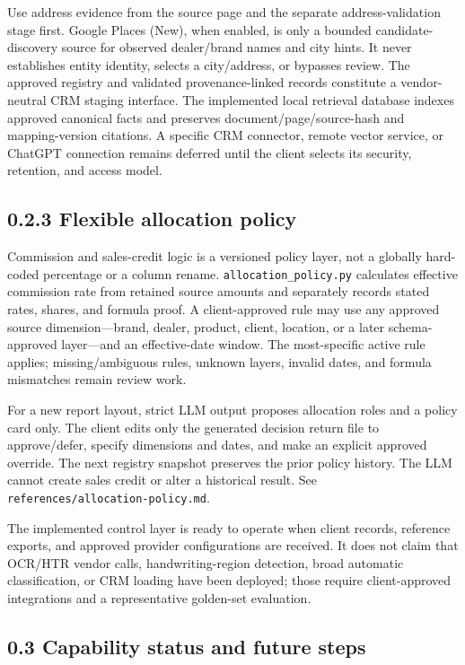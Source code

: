 \documentclass[
]{article}
\begin{document}
Use address evidence from the source page and the separate
address-validation stage first. Google Places (New), when enabled, is
only a bounded candidate-discovery source for observed dealer/brand
names and city hints. It never establishes entity identity, selects a
city/address, or bypasses review. The approved registry and validated
provenance-linked records constitute a vendor-neutral CRM staging
interface. The implemented local retrieval database indexes approved
canonical facts and preserves document/page/source-hash and
mapping-version citations. A specific CRM connector, remote vector
service, or ChatGPT connection remains deferred until the client selects
its security, retention, and access model.

\subsection{0.2.3 Flexible allocation
policy}\label{flexible-allocation-policy}

Commission and sales-credit logic is a versioned policy layer, not a
globally hard-coded percentage or a column rename.
\texttt{allocation\_\allowbreak{}policy.py} calculates effective
commission rate from retained source amounts and separately records
stated rates, shares, and formula proof. A client-approved rule may use
any approved source dimension---brand, dealer, product, client,
location, or a later schema-approved layer---and an effective-date
window. The most-specific active rule applies; missing/ambiguous rules,
unknown layers, invalid dates, and formula mismatches remain review
work.

For a new report layout, strict LLM output proposes allocation roles and
a policy card only. The client edits only the generated decision return
file to approve/defer, specify dimensions and dates, and make an
explicit approved override. The next registry snapshot preserves the
prior policy history. The LLM cannot create sales credit or alter a
historical result. See
\texttt{references/\allowbreak{}allocation-\allowbreak{}policy.md}.

The implemented control layer is ready to operate when client records,
reference exports, and approved provider configurations are received. It
does not claim that OCR/HTR vendor calls, handwriting-region detection,
broad automatic classification, or CRM loading have been deployed; those
require client-approved integrations and a representative golden-set
evaluation.

\subsection{0.3 Capability status and future
steps}\label{capability-status-and-future-steps}
\end{document}
